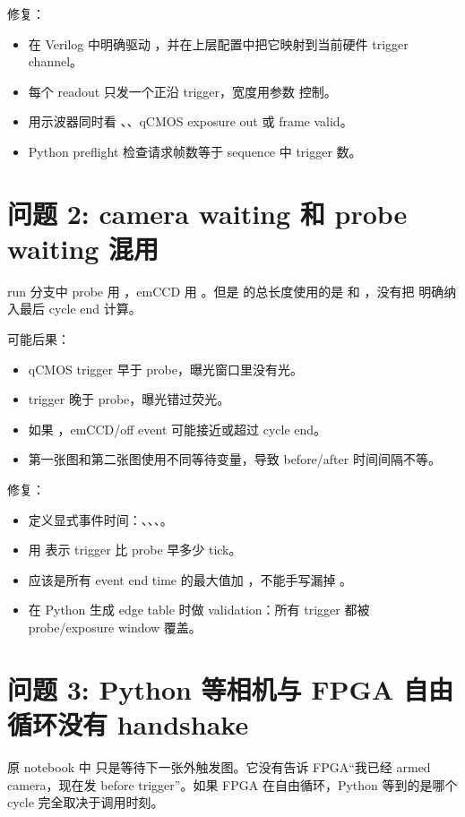 \documentclass[11pt,oneside,openany]{book}
\begin{document}
修复：
\begin{itemize}
  \item 在 Verilog 中明确驱动 ，并在上层配置中把它映射到当前硬件 trigger channel。
  \item 每个 readout 只发一个正沿 trigger，宽度用参数  控制。
  \item 用示波器同时看 、、qCMOS exposure out 或 frame valid。
  \item Python preflight 检查请求帧数等于 sequence 中 trigger 数。
\end{itemize}

\section{问题 2: camera waiting 和 probe waiting 混用}
run 分支中 probe 用 ，emCCD 用 。但是  的总长度使用的是  和 ，没有把  明确纳入最后 cycle end 计算。

可能后果：
\begin{itemize}
  \item qCMOS trigger 早于 probe，曝光窗口里没有光。
  \item trigger 晚于 probe，曝光错过荧光。
  \item 如果 ，emCCD/off event 可能接近或超过 cycle end。
  \item 第一张图和第二张图使用不同等待变量，导致 before/after 时间间隔不等。
\end{itemize}

修复：
\begin{itemize}
  \item 定义显式事件时间：、、、。
  \item 用  表示 trigger 比 probe 早多少 tick。
  \item {} 应该是所有 event end time 的最大值加 ，不能手写漏掉 。
  \item 在 Python 生成 edge table 时做 validation：所有 trigger 都被 probe/exposure window 覆盖。
\end{itemize}

\section{问题 3: Python 等相机与 FPGA 自由循环没有 handshake}
原 notebook 中  只是等待下一张外触发图。它没有告诉 FPGA“我已经 armed camera，现在发 before trigger”。如果 FPGA 在自由循环，Python 等到的是哪个 cycle 完全取决于调用时刻。
\end{document}
